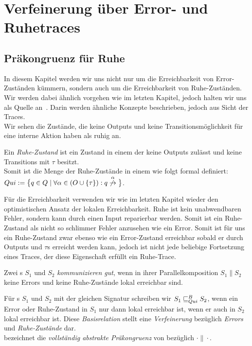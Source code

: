 \chapter{Verfeinerung über Error- und Ruhetraces}

\section{Präkongruenz für Ruhe}

In diesem Kapitel werden wir uns nicht nur um die Erreichbarkeit von
Error-Zuständen kümmern, sondern auch um die Erreichbarkeit von
Ruhe-Zuständen. Wir werden dabei ähnlich vorgehen wie im letzten Kapitel,
jedoch halten wir uns als Quelle an~\cite{Chilton2013}. Darin werden ähnliche
Konzepte beschrieben, jedoch aus Sicht der Traces.\\
Wir sehen die Zustände, die keine Outputs und keine Transitionsmöglichkeit für
eine interne Aktion haben als ruhig an.

\begin{Def}[Ruhe]
  Ein \emph{Ruhe-Zustand} ist ein Zustand in einem \EIO{} der keine
  Outputs zulässt und keine Transitions mit $\tau$ besitzt.\\
  Somit ist die Menge der Ruhe-Zustände in einem \EIO{} wie folgt formal
  definiert: $Qui:=\big\{q\in Q\mid \forall \alpha\in (O\cup \{\tau\}): q
  \overset{\alpha}{\not{\hspace{-0.1cm}\rightarrow}}\big\}$.
\end{Def}

Für die Erreichbarkeit verwenden wir wie im letzten Kapitel wieder den
optimistischen Ansatz der lokalen Erreichbarkeit. Ruhe ist kein
unabwendbaren Fehler, sondern kann durch einen Input reparierbar werden. Somit
ist ein Ruhe-Zustand als nicht so \glqq{}schlimmer\grqq{} Fehler anzusehen wie
ein Error. Somit ist für uns ein Ruhe-Zustand zwar ebenso wie ein Error-Zustand
erreichbar sobald er durch Outputs und $\tau$s erreicht werden kann, jedoch ist
nicht jede beliebige Fortsetzung eines Traces, der diese Eigenschaft erfüllt
ein Ruhe-Trace.

\begin{Def}
  Zwei \EIO{}s $S_1$ und $S_2$ \emph{kommunizieren gut}, wenn in ihrer
  Parallelkomposition $S_1\| S_2$ keine Errors und keine Ruhe-Zustände lokal
  erreichbar sind.
\end{Def}

\begin{Def}
  Für \EIO{}s $S_1$ und $S_2$ mit der gleichen Signatur schreiben wir
  $S_1\sqsubseteq _{Qui}^B S_2$, wenn ein Error oder Ruhe-Zustand in $S_1$ nur dann lokal
  erreichbar ist, wenn er auch in $S_2$ lokal erreichbar ist. Diese
  \emph{Basisrelation} stellt eine \emph{Verfeinerung} bezüglich \emph{Errors}
  und \emph{Ruhe-Zustände} dar.\\
  \QCRel{} bezeichnet die \emph{vollständig abstrakte Präkongruenz} von
  \QBRel{} bezüglich $\cdot\|\cdot$.
\end{Def}

